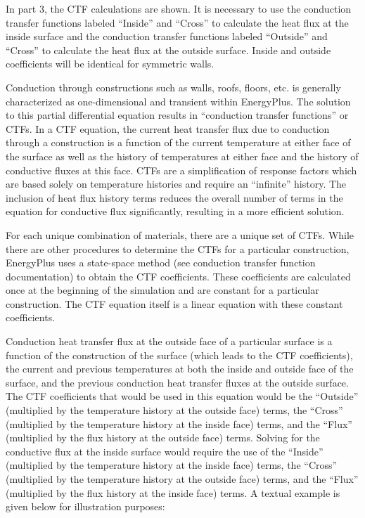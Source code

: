 In part 3, the CTF calculations are shown. It is necessary to use the conduction transfer functions labeled ``Inside'' and ``Cross'' to calculate the heat flux at the inside surface and the conduction transfer functions labeled ``Outside'' and ``Cross'' to calculate the heat flux at the outside surface. Inside and outside coefficients will be identical for symmetric walls.

Conduction through constructions such as walls, roofs, floors, etc. is generally characterized as one-dimensional and transient within EnergyPlus. The solution to this partial differential equation results in ``conduction transfer functions'' or CTFs. In a CTF equation, the current heat transfer flux due to conduction through a construction is a function of the current temperature at either face of the surface as well as the history of temperatures at either face and the history of conductive fluxes at this face. CTFs are a simplification of response factors which are based solely on temperature histories and require an ``infinite'' history. The inclusion of heat flux history terms reduces the overall number of terms in the equation for conductive flux significantly, resulting in a more efficient solution.

For each unique combination of materials, there are a unique set of CTFs. While there are other procedures to determine the CTFs for a particular construction, EnergyPlus uses a state-space method (see conduction transfer function documentation) to obtain the CTF coefficients. These coefficients are calculated once at the beginning of the simulation and are constant for a particular construction. The CTF equation itself is a linear equation with these constant coefficients.

Conduction heat transfer flux at the outside face of a particular surface is a function of the construction of the surface (which leads to the CTF coefficients), the current and previous temperatures at both the inside and outside face of the surface, and the previous conduction heat transfer fluxes at the outside surface. The CTF coefficients that would be used in this equation would be the ``Outside'' (multiplied by the temperature history at the outside face) terms, the ``Cross'' (multiplied by the temperature history at the inside face) terms, and the ``Flux'' (multiplied by the flux history at the outside face) terms. Solving for the conductive flux at the inside surface would require the use of the ``Inside'' (multiplied by the temperature history at the inside face) terms, the ``Cross'' (multiplied by the temperature history at the outside face) terms, and the ``Flux'' (multiplied by the flux history at the inside face) terms. A textual example is given below for illustration purposes:


